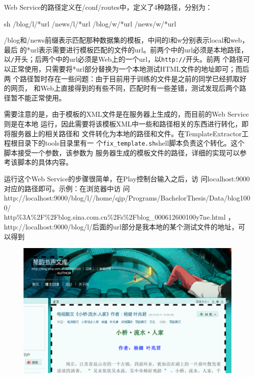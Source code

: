 \documentclass{article}
\begin{document}
Web Service的路径定义在\prj/conf/routes中，定义了4种路径，分别为：\\
\begin{code}{sh}
/blog/l/*url
/news/l/*url
/blog/w/*url
/news/w/*url  
\end{code}
/blog和/news前缀表示匹配那种数据集的模板，中间的l和w分别表示local和web，最后
的*url表示需要进行模板匹配的文件的url。前两个中的url必须是本地路径，
以\texttt{/}开头；后两个中的url必须是Web上的一个url，以\texttt{http://}开头。前两
个路径可以正常使用，只需要将*url部分替换为一个本地测试HTML文件的地址即可；而后两
个路径暂时存在一些问题：由于目前用于训练的文件是之前的同学已经抓取好的网页，
和Web上直接得到的有些不同，匹配时有一些差错，测试发现后两个路径暂不能正常使用。

需要注意的是，由于模板的XML文件是在服务器上生成的，而目前的Web Service则是在本地
运行，因此需要将该模板XML中一些和路径相关的东西进行转化，即将服务器上的相关路径和
文件转化为本地的路径和文件。在TemplateExtractor工程根目录下的tools目录里有一
个\texttt{fix\_template.sh}shell脚本负责这个转化。这个脚本接受一个参数，该参数为
服务器生成的模板文件的路径，详细的实现可以参考该脚本的具体内容。

运行这个Web Service的步骤很简单，在Play控制台输入之后，访
问localhost:9000对应的路径即可。示例：在浏览器中访
问
http://localhost:9000/blog/l//home/qjp/Programs/BachelorThesis/Data/blog1000/\\http\%3A\%2F\%2Fblog.sina.com.cn\%2Fs\%2Fblog\_000612600100y7ne.html
，http://localhost:9000/blog/l/后面的url部分是我本地的某个测试文件的地址，可以得到\\
\begin{figure}[h]
  \centering
  \includegraphics[width=0.8\linewidth]{demo}
\end{figure}
\end{document}

